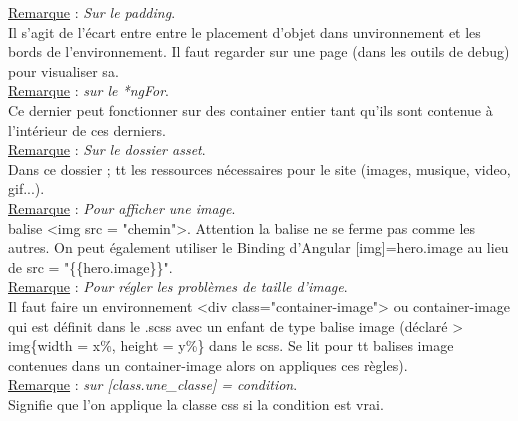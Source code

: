 \documentclass[a4paper,12pt,twoside]{article}
\newcommand{\incode}[1]{{\footnotesize\ttfamily #1}} %
\newcommand{\rem}[2]{\noindent\underline{Remarque} : \textit{#1}.\\ \indent #2}
\begin{document}
\rem{Sur le padding}{Il s'agit de l'écart entre entre le placement d'objet dans unvironnement et les bords de l'environnement. Il faut regarder sur une page (dans les outils de debug) pour visualiser sa.}\\

\rem{sur le *ngFor}{Ce dernier peut fonctionner sur des container entier tant qu'ils sont contenue à l'intérieur de ces derniers.}\\

\rem{Sur le dossier \incode{asset}}{Dans ce dossier ; tt les ressources nécessaires pour le site (images, musique, video, gif...).}\\

\rem{Pour afficher une image}{balise <img src = "chemin">. Attention la balise ne se ferme pas comme les autres. On peut également utiliser le Binding d'Angular [img]=hero.image au lieu de src = "\{\{hero.image\}\}".}\\

\rem{Pour régler les problèmes de taille d'image}{Il faut faire un environnement <div class="container-image"> ou container-image qui est définit dans le .scss avec un enfant de type balise image (déclaré > img\{width = x\%, height = y\%\} dans le scss. Se lit pour tt balises image contenues dans un container-image alors on appliques ces règles).}\\

\rem{sur [class.une\_classe] = condition}{Signifie que l'on applique la classe css si la condition est vrai.}\\











\end{document}
